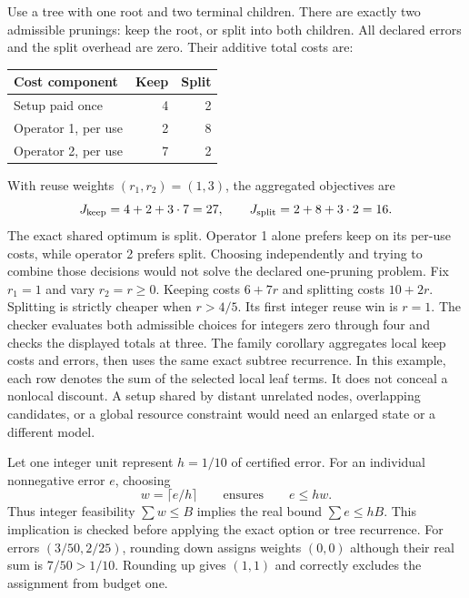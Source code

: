 Use a tree with one root and two terminal children. There are exactly two admissible prunings: keep the root, or split into both children. All declared errors and the split overhead are zero. Their additive total costs are:
\begin{center}
\begin{tabular}{lrr}\toprule
Cost component & Keep & Split\\\midrule
Setup paid once & 4 & 2\\
Operator 1, per use & 2 & 8\\
Operator 2, per use & 7 & 2\\\bottomrule
\end{tabular}
\end{center}
With reuse weights $(r_1,r_2)=(1,3)$, the aggregated objectives are
\[
J_{\rm keep}=4+2+3\cdot7=27,\qquad
J_{\rm split}=2+8+3\cdot2=16.
\]
The exact shared optimum is split. Operator 1 alone prefers keep on its per-use costs, while operator 2 prefers split. Choosing independently and trying to combine those decisions would not solve the declared one-pruning problem.
Fix $r_1=1$ and vary $r_2=r\ge0$. Keeping costs $6+7r$ and splitting costs $10+2r$. Splitting is strictly cheaper when $r>4/5$. Its first integer reuse win is $r=1$. The checker evaluates both admissible choices for integers zero through four and checks the displayed totals at three.
The family corollary aggregates local keep costs and errors, then uses the same exact subtree recurrence. In this example, each row denotes the sum of the selected local leaf terms. It does not conceal a nonlocal discount. A setup shared by distant unrelated nodes, overlapping candidates, or a global resource constraint would need an enlarged state or a different model.

Let one integer unit represent $h=1/10$ of certified error. For an individual nonnegative error $e$, choosing
\[
w=\lceil e/h\rceil\qquad\text{ensures}\qquad e\le hw.
\]
Thus integer feasibility $\sum w\le B$ implies the real bound $\sum e\le hB$. This implication is checked before applying the exact option or tree recurrence.
For errors $(3/50,2/25)$, rounding down assigns weights $(0,0)$ although their real sum is $7/50>1/10$. Rounding up gives $(1,1)$ and correctly excludes the assignment from budget one.

